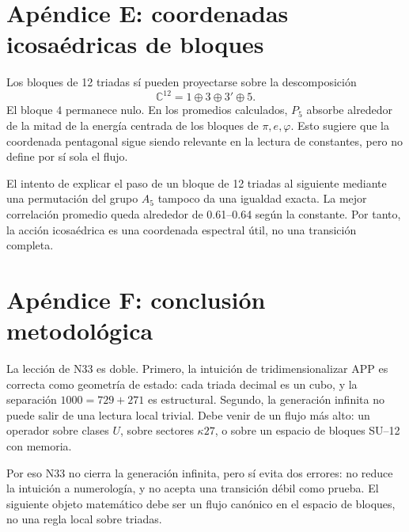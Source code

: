 \documentclass[11pt,a4paper]{article}
\begin{document}
\section{Apéndice E: coordenadas icosaédricas de bloques}
Los bloques de 12 triadas sí pueden proyectarse sobre la descomposición
\[
\mathbb C^{12}=1\oplus3\oplus3'\oplus5.
\]
El bloque \(4\) permanece nulo. En los promedios calculados, \(P_5\) absorbe alrededor de la mitad de la energía centrada de los bloques de \(\pi,e,\varphi\). Esto sugiere que la coordenada pentagonal sigue siendo relevante en la lectura de constantes, pero no define por sí sola el flujo.

El intento de explicar el paso de un bloque de 12 triadas al siguiente mediante una permutación del grupo \(A_5\) tampoco da una igualdad exacta. La mejor correlación promedio queda alrededor de 0.61--0.64 según la constante. Por tanto, la acción icosaédrica es una coordenada espectral útil, no una transición completa.

\section{Apéndice F: conclusión metodológica}
La lección de N33 es doble. Primero, la intuición de tridimensionalizar APP es correcta como geometría de estado: cada triada decimal es un cubo, y la separación \(1000=729+271\) es estructural. Segundo, la generación infinita no puede salir de una lectura local trivial. Debe venir de un flujo más alto: un operador sobre clases \(U\), sobre sectores \(\kappa27\), o sobre un espacio de bloques SU--12 con memoria.

Por eso N33 no cierra la generación infinita, pero sí evita dos errores: no reduce la intuición a numerología, y no acepta una transición débil como prueba. El siguiente objeto matemático debe ser un flujo canónico en el espacio de bloques, no una regla local sobre triadas.
\end{document}
